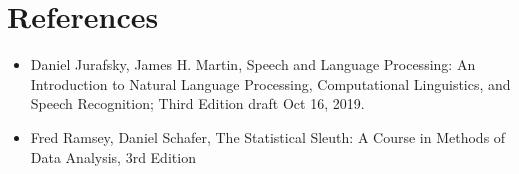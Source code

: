 \documentclass[a4paper,14pt]{extarticle}
\begin{document}
\section{References}
\begin{itemize}
    \item Daniel Jurafsky, James H. Martin, Speech and Language Processing: An Introduction to Natural Language Processing, Computational Linguistics, and Speech Recognition; Third Edition draft Oct 16, 2019.
    \item Fred Ramsey, Daniel Schafer, The Statistical Sleuth: A Course in Methods of Data Analysis, 3rd Edition


\end{itemize}
\end{document}
